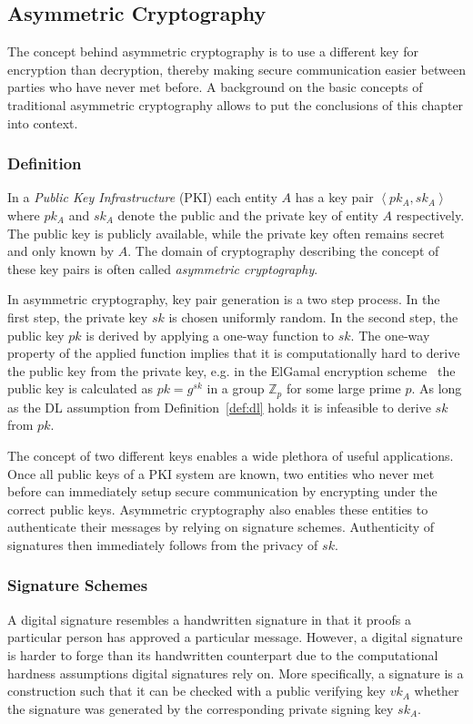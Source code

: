\subsection{Asymmetric Cryptography}
\label{sec:asymmetric_cryptography}
The concept behind asymmetric cryptography is to use a different key for encryption than decryption, thereby making secure communication easier between parties who have never met before. A background on the basic concepts of traditional asymmetric cryptography allows to put the conclusions of this chapter into context.

\subsubsection{Definition}
In a \textit{Public Key Infrastructure} (PKI) each entity $A$ has a key pair $\left< pk_A, sk_A \right>$ where $pk_A$ and $sk_A$ denote the public and the private key of entity $A$ respectively. The public key is publicly available, while the private key often remains secret and only known by $A$. The domain of cryptography describing the concept of these key pairs is often called \textit{asymmetric cryptography}. 

In asymmetric cryptography, key pair generation is a two step process. In the first step, the private key $sk$ is chosen uniformly random. In the second step, the public key $pk$ is derived by applying a one-way function to $sk$. The one-way property of the applied function implies that it is computationally hard to derive the public key from the private key, e.g. in the ElGamal encryption scheme~\cite{art:Elgamal85} the public key is calculated as $pk = g^{sk}$ in a group $\mathbb{Z}_p$ for some large prime $p$. As long as the DL assumption from Definition~\ref{def:dl} holds it is infeasible to derive $sk$ from $pk$.

The concept of two different keys enables a wide plethora of useful applications. Once all public keys of a PKI system are known, two entities who never met before can immediately setup secure communication by encrypting under the correct public keys. Asymmetric cryptography also enables these entities to authenticate their messages by relying on signature schemes. Authenticity of signatures then immediately follows from the privacy of $sk$.

\subsubsection{Signature Schemes}
A digital signature resembles a handwritten signature in that it proofs a particular person has approved a particular message. However, a digital signature is harder to forge than its handwritten counterpart due to the computational hardness assumptions digital signatures rely on. More specifically, a signature is a construction such that it can be checked with a public verifying key $vk_A$ whether the signature was generated by the corresponding private signing key $sk_A$.

